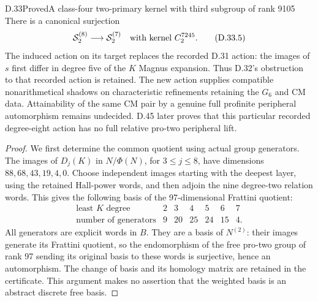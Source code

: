 \begin{statement}{D.33}{Proved}{A class-four two-primary kernel with third subgroup of rank 9105}
There is a canonical surjection
\[
 \mathcal S_2^{(8)}\longrightarrow\mathcal S_2^{(7)}
 \quad\hbox{with kernel }C_2^{7245}.                  \tag{D.33.5}
\]
The induced action on its target replaces the recorded D.31 action:
the images of $s$ first differ in degree five of the $K$ Magnus expansion.
Thus D.32's obstruction to that recorded action is retained. The new
action supplies compatible nonarithmetical shadows on characteristic
refinements retaining the $G_6$ and CM data. Attainability of the same
CM pair by a genuine full profinite peripheral automorphism remains
undecided. D.45 later proves that this particular recorded degree-eight
action has no full relative pro-two peripheral lift.
\end{statement}
\begin{proof}
We first determine the common quotient using actual group generators.
The images of $D_j(K)$ in $N/\Phi(N)$, for $3\leq j\leq8$, have dimensions
$88,68,43,19,4,0$. Choose independent images starting with the deepest
layer, using the retained Hall-power words, and then adjoin the nine
degree-two relation words. This gives the following basis of the
97-dimensional Frattini quotient:
\[
\begin{array}{c|rrrrrr}
 \text{least }K\text{ degree}&2&3&4&5&6&7\\\hline
 \text{number of generators}&9&20&25&24&15&4.
\end{array}                                                     \tag{D.33.6}
\]
All generators are explicit words in $B$. They are a basis of $N^{(2)}$:
their images generate its Frattini quotient, so the endomorphism of the
free pro-two group of rank 97 sending its original basis to these words
is surjective, hence an automorphism. The change of basis and its
homology matrix are retained in the certificate. This argument makes
no assertion that the weighted basis is an abstract discrete free basis.


\end{proof}

